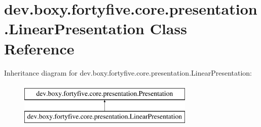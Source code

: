 \hypertarget{classdev_1_1boxy_1_1fortyfive_1_1core_1_1presentation_1_1_linear_presentation}{
\section{dev.boxy.fortyfive.core.presentation.LinearPresentation Class Reference}
\label{db/dad/classdev_1_1boxy_1_1fortyfive_1_1core_1_1presentation_1_1_linear_presentation}
}
Inheritance diagram for dev.boxy.fortyfive.core.presentation.LinearPresentation:\begin{figure}[H]
\begin{center}
\leavevmode
\includegraphics[height=2.000000cm]{db/dad/classdev_1_1boxy_1_1fortyfive_1_1core_1_1presentation_1_1_linear_presentation}
\end{center}
\end{figure}
